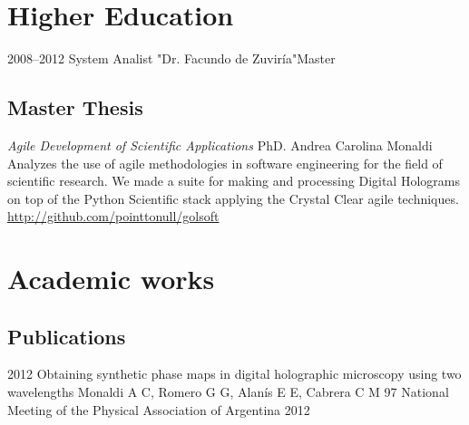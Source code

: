\documentclass[11pt,a4paper]{moderncv}
\begin{document}
\section{Higher Education}

    \cventry
        {2008--2012}
        {System Analist}
        {"Dr. Facundo de Zuviría"}{Master}{}{}{}

    \subsection{Master Thesis}
            {\emph{Agile Development of Scientific Applications}}
            {PhD. Andrea Carolina Monaldi}
            {
                \small Analyzes the use of agile methodologies in software
                    engineering for the field of scientific research.
                We made a suite for making and processing Digital Holograms on
                    top of the Python Scientific stack applying the Crystal
                    Clear agile techniques.
                    \url{http://github.com/pointtonull/golsoft}
            }


\section{Academic works}                                                                                          %

    \subsection{Publications}                                                                                     %

        \cventry                                                                                                  %
            {2012}                                                                                                %
            {                                                                                                     %
                Obtaining synthetic phase maps in digital holographic                                             %
                    microscopy using two wavelengths                                                              %
            }                                                                                                     %
            {Monaldi A C, Romero G G, Alanís E E, Cabrera C M}                                                    %
            {97 National Meeting of the Physical Association of Argentina}                                        %
            {2012}                                                                                                %
            {}                                                                                                    %
\end{document}
